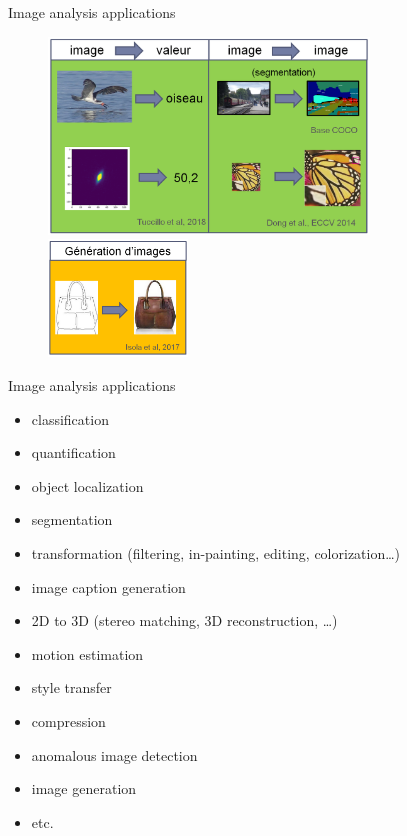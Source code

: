 \documentclass[xcolor=pdftex,dvipsnames,table,mathserif]{beamer}
\begin{document}
\begin{frame}{Image analysis applications}

  \begin{figure}[ht]
    \centering
    \includegraphics[width=0.76\textwidth]{applis_dl_sup}
    \includegraphics[width=0.33\textwidth]{applis_dl_nonsup}
  \end{figure}


\end{frame}


\begin{frame}{Image analysis applications}

  \begin{itemize}
  \item classification
  \item quantification
  \item object localization
  \item segmentation
  \item transformation (filtering, in-painting, editing, colorization…)
  \item image caption generation
  \item 2D to 3D (stereo matching, 3D reconstruction, …)
  \item motion estimation
  \item style transfer
  \item compression
  \item anomalous image detection
  \item image generation
  \item etc.
  \end{itemize}

\end{frame}
\end{document}
